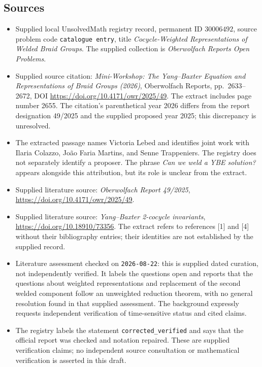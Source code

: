\documentclass[11pt]{article}
\begin{document}
\subsection{Sources}
\begin{itemize}
\item Supplied local UnsolvedMath registry record, permanent ID \(30006492\), source problem code \texttt{catalogue entry}, title \emph{Cocycle-Weighted Representations of Welded Braid Groups}. The supplied collection is \emph{Oberwolfach Reports Open Problems}.
\item Supplied source citation: \emph{Mini-Workshop: The Yang--Baxter Equation and Representations of Braid Groups (2026)}, Oberwolfach Reports, pp.\ 2633--2672, DOI \url{https://doi.org/10.4171/owr/2025/49}. The extract includes page number 2655. The citation's parenthetical year 2026 differs from the report designation 49/2025 and the supplied proposed year 2025; this discrepancy is unresolved.
\item The extracted passage names Victoria Lebed and identifies joint work with Ilaria Colazzo, Jo\~ao Faria Martins, and Senne Trappeniers. The registry does not separately identify a proposer. The phrase \emph{Can we weld a YBE solution?} appears alongside this attribution, but its role is unclear from the extract.
\item Supplied literature source: \emph{Oberwolfach Report 49/2025}, \url{https://doi.org/10.4171/owr/2025/49}.
\item Supplied literature source: \emph{Yang--Baxter 2-cocycle invariants}, \url{https://doi.org/10.18910/73356}. The extract refers to references [1] and [4] without their bibliography entries; their identities are not established by the supplied record.
\item Literature assessment checked on \texttt{2026-08-22}: this is supplied dated curation, not independently verified. It labels the questions open and reports that the questions about weighted representations and replacement of the second welded component follow an unweighted reduction theorem, with no general resolution found in that supplied assessment. The background expressly requests independent verification of time-sensitive status and cited claims.
\item The registry labels the statement \texttt{corrected\_verified} and says that the official report was checked and notation repaired. These are supplied verification claims; no independent source consultation or mathematical verification is asserted in this draft.
\end{itemize}
\end{document}
